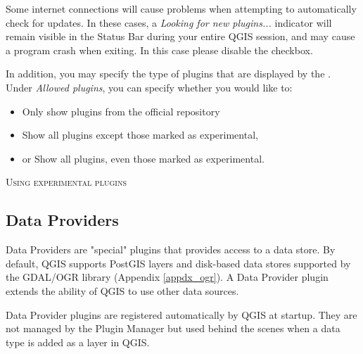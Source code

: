 Some internet connections will cause problems when attempting to automatically check for updates. In these cases, a \textit{Looking for new plugins...} indicator will remain visible in the Status Bar during your entire QGIS session, and may cause a program crash when exiting. In this case please disable the checkbox.

In addition, you may specify the type of plugins that are displayed by the . Under \textit{Allowed plugins}, you can specify whether you would like to:

\begin{itemize}
\item Only show plugins from the official repository
\item Show all plugins except those marked as experimental,
\item or Show all plugins, even those marked as experimental.
\end{itemize}

\begin{Tip}
 \caption{\textsc{Using experimental plugins}}
\end{Tip}


\subsection{Data Providers}

Data Providers are "special" plugins that provides access to a data store.
By default, QGIS supports PostGIS layers and disk-based data stores supported by the GDAL/OGR library (Appendix \ref{appdx_ogr}).
A Data Provider plugin extends the ability of QGIS to use other data sources.

Data Provider plugins are registered automatically by QGIS at startup.
They are not managed by the Plugin Manager but used behind the scenes when a data type is added as a layer in QGIS.
